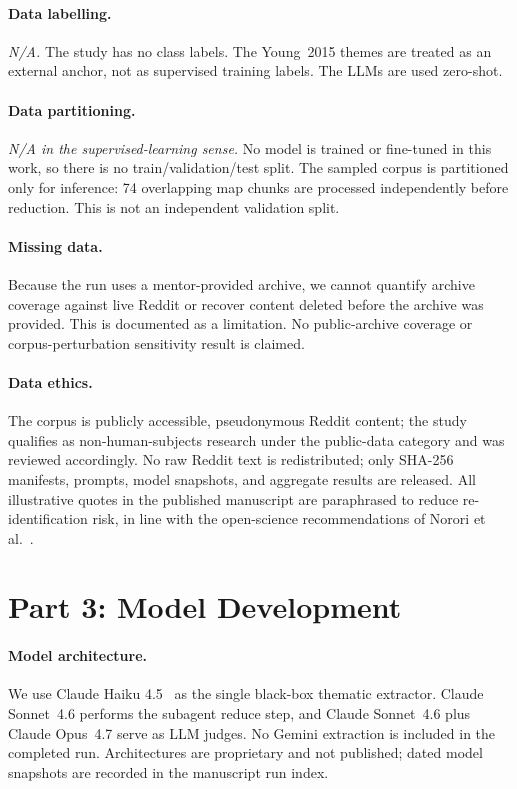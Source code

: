 \documentclass[11pt]{article}
\begin{document}
\paragraph{Data labelling.}
\emph{N/A.} The study has no class labels. The Young~2015 themes are
treated as an external anchor, not as supervised training labels. The
LLMs are used zero-shot.

\paragraph{Data partitioning.}
\emph{N/A in the supervised-learning sense.} No model is trained or
fine-tuned in this work, so there is no train/validation/test split.
The sampled corpus is partitioned only for inference: 74 overlapping
map chunks are processed independently before reduction. This is not an
independent validation split.

\paragraph{Missing data.}
Because the run uses a mentor-provided archive, we cannot quantify
archive coverage against live Reddit or recover content deleted before
the archive was provided. This is documented as a limitation. No
public-archive coverage or corpus-perturbation sensitivity result is
claimed.

\paragraph{Data ethics.}
The corpus is publicly accessible, pseudonymous Reddit content; the
study qualifies as non-human-subjects research under the public-data
category and was reviewed accordingly. No raw Reddit text is
redistributed; only SHA-256 manifests, prompts, model snapshots, and
aggregate results are released. All illustrative quotes in the
published manuscript are paraphrased to reduce re-identification risk,
in line with the open-science recommendations of
Norori et al.~\cite{norori2021addressing}.

\section*{Part 3: Model Development}

\paragraph{Model architecture.}
We use Claude Haiku 4.5~\cite{anthropic_claude_haiku} as the single
black-box thematic extractor. Claude Sonnet~4.6 performs the subagent
reduce step, and Claude Sonnet~4.6 plus Claude Opus~4.7 serve as LLM
judges. No Gemini extraction is included in the completed run.
Architectures are proprietary and not published; dated model snapshots
are recorded in the manuscript run index.
\end{document}

